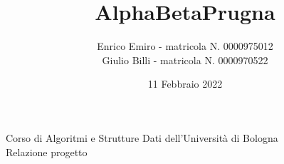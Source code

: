 \documentclass[a4paper, 12pt]{extarticle}
\title{AlphaBetaPrugna}
\author{Enrico Emiro - matricola N. 0000975012\\
Giulio Billi - matricola N. 0000970522}
\date{11 Febbraio 2022}
\begin{document}
\maketitle
\begin{center}
    Corso di Algoritmi e Strutture Dati dell'Università di Bologna\\
    Relazione progetto
\end{center}
\tableofcontents
\listofalgorithms
\newpage











\end{document}
